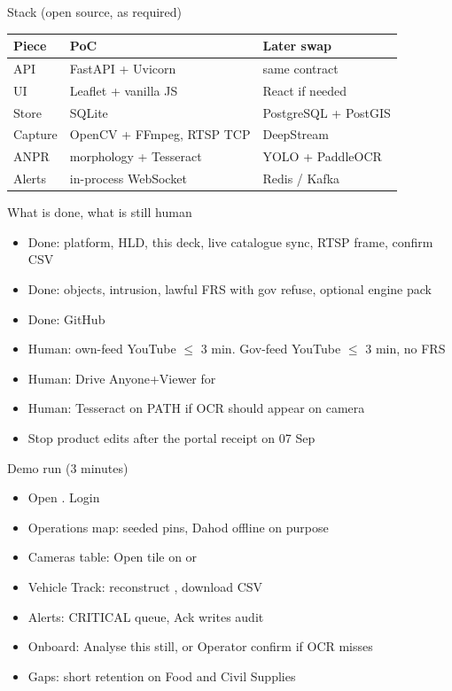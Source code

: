 \documentclass[aspectratio=169,11pt]{beamer}
\begin{document}
\begin{frame}{Stack (open source, as required)}
\begin{center}
\begin{tabular}{@{}lll@{}}
\toprule
Piece & PoC & Later swap \\
\midrule
API & FastAPI + Uvicorn & same contract \\
UI & Leaflet + vanilla JS & React if needed \\
Store & SQLite & PostgreSQL + PostGIS \\
Capture & OpenCV + FFmpeg, RTSP TCP & DeepStream \\
ANPR & morphology + Tesseract & YOLO + PaddleOCR \\
Alerts & in-process WebSocket & Redis / Kafka \\
\bottomrule
\end{tabular}
\end{center}
\end{frame}

\begin{frame}{What is done, what is still human}
\begin{itemize}\itemsep0.5em
\item Done: platform, HLD, this deck, live catalogue sync, RTSP frame, confirm CSV
\item Done: objects, intrusion, lawful FRS with gov refuse, optional engine pack
\item Done: GitHub 
\item Human: own-feed YouTube $\le$ 3 min. Gov-feed YouTube $\le$ 3 min, no FRS
\item Human: Drive Anyone+Viewer for 
\item Human: Tesseract on PATH if OCR should appear on camera
\item Stop product edits after the portal receipt on 07 Sep
\end{itemize}
\end{frame}

\begin{frame}{Demo run (3 minutes)}
\begin{itemize}\itemsep0.5em
\item Open . Login 
\item Operations map: seeded pins, Dahod offline on purpose
\item Cameras table: Open tile on  or 
\item Vehicle Track: reconstruct , download CSV
\item Alerts: CRITICAL queue, Ack writes audit
\item Onboard: Analyse this still, or Operator confirm if OCR misses
\item Gaps: short retention on Food and Civil Supplies
\end{itemize}
\end{frame}
\end{document}
